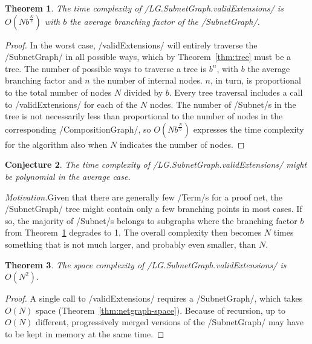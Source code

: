 \documentclass[12pt,a4paper]{article}
\newtheorem{theorem}{Theorem}
\newtheorem{conjecture}[theorem]{Conjecture}
\begin{document}
\begin{theorem}\label{thm:exponential}
    The time complexity of \hs/LG.SubnetGraph.validExtensions/ is $O(Nb^{\frac{N}{b}})$ with $b$ the average branching factor of the \hs/SubnetGraph/.
\end{theorem}
\begin{proof}
    In the worst case, \hs/validExtensions/ will entirely traverse the \hs/SubnetGraph/ in all possible ways, which by Theorem~\ref{thm:tree} must be a tree. The number of possible ways to traverse a tree is $b^n$, with $b$ the average branching factor and $n$ the number of internal nodes. $n$, in turn, is proportional to the total number of nodes $N$ divided by $b$. Every tree traversal includes a call to \hs/validExtensions/ for each of the $N$ nodes. The number of \hs/Subnet/s in the tree is not necessarily less than proportional to the number of nodes in the corresponding \hs/CompositionGraph/, so $O(Nb^{\frac{N}{b}})$ expresses the time complexity for the algorithm also when $N$ indicates the number of nodes.
\end{proof}

\begin{conjecture}\label{cnj:polynomial}
    The time complexity of \hs/LG.SubnetGraph.validExtensions/ might be polynomial in the average case.
\end{conjecture}
\noindent\emph{Motivation.}\hspace{6pt}Given that there are generally few \hs/Term/s for a proof net, the \hs/SubnetGraph/ tree might contain only a few branching points in most cases. If so, the majority of \hs/Subnet/s belongs to subgraphs where the branching factor $b$ from Theorem~\ref{thm:exponential} degrades to 1. The overall complexity then becomes $N$ times something that is not much larger, and probably even smaller, than $N$.

\begin{theorem}\label{thm:extend-space}
    The space complexity of \hs/LG.SubnetGraph.validExtensions/ is $O(N^2)$.
\end{theorem}
\begin{proof}
    A single call to \hs/validExtensions/ requires a \hs/SubnetGraph/, which takes $O(N)$ space (Theorem~\ref{thm:netgraph-space}). Because of recursion, up to $O(N)$ different, progressively merged versions of the \hs/SubnetGraph/ may have to be kept in memory at the same time.
\end{proof}
\end{document}
